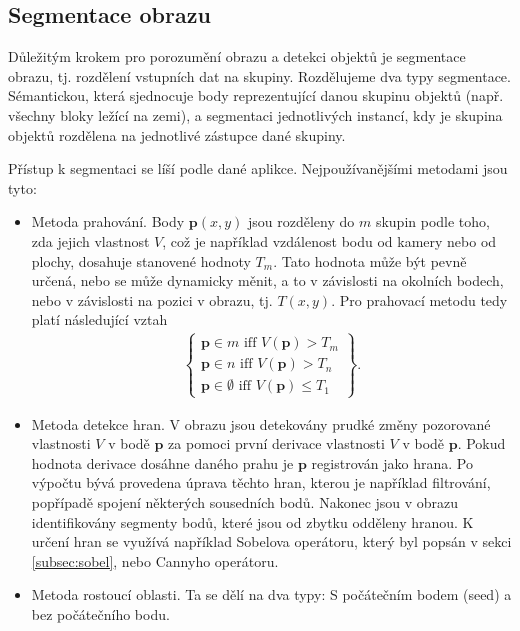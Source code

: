 \documentclass[twoside]{ctuthesis}
\newcommand{\tl}[1]{$\mathbf{#1}$}
\begin{document}
\subsection{Segmentace obrazu}
\label{subsection:segmentation}
Důležitým krokem pro porozumění obrazu a detekci objektů je segmentace obrazu, tj. rozdělení vstupních dat na skupiny. Rozdělujeme dva typy segmentace. Sémantickou, která sjednocuje body reprezentující danou skupinu objektů (např. všechny bloky ležící na zemi), a segmentaci jednotlivých instancí, kdy je skupina objektů rozdělena na jednotlivé zástupce dané skupiny. 

    Přístup k segmentaci se líší podle dané aplikce. Nejpoužívanějšími metodami jsou tyto:
\begin{itemize}
    \item Metoda prahování. Body $\mathbf{p}(x,y)$ jsou rozděleny do $m$ skupin podle toho, zda jejich vlastnost $V$, což je například vzdálenost bodu od kamery nebo od plochy, dosahuje stanovené hodnoty $T_m$. Tato hodnota může být pevně určená, nebo se může dynamicky měnit, a to v závislosti na okolních bodech, nebo v závislosti na pozici v obrazu, tj. $T(x,y)$. Pro prahovací metodu tedy platí následující vztah
        \begin{align}
\left\{ 
        \begin{gathered}
            \mathbf{p} \in m \text{ iff } V(\mathbf{p}) > T_m \\
            \mathbf{p} \in n \text{ iff } V(\mathbf{p}) > T_n \\
            \mathbf{p} \in \emptyset \text{ iff } V(\mathbf{p}) \leq T_1 
        \end{gathered}
\right\}.
        \end{align}
 
    \item Metoda detekce hran. V obrazu jsou detekovány prudké změny pozorované vlastnosti $V$ v bodě \tl{p} za pomoci první derivace vlastnosti $V$ v bodě \tl{p}. Pokud hodnota derivace dosáhne daného prahu je \tl{p} registrován jako hrana. Po výpočtu bývá provedena úprava těchto hran, kterou je například filtrování, popřípadě spojení některých sousedních bodů. Nakonec jsou v obrazu identifikovány segmenty bodů, které jsou od zbytku odděleny hranou. K určení hran se využívá například Sobelova operátoru, který byl popsán v sekci \ref{subsec:sobel}, nebo Cannyho operátoru.\cite{single_RGBD_reconstruction}

    \item Metoda rostoucí oblasti. Ta se dělí na dva typy: S počátečním bodem (seed) a bez počátečního bodu. 


\end{itemize}
\end{document}
